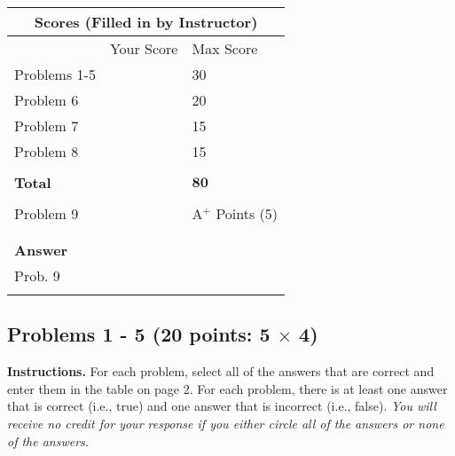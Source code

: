 \documentclass[letterpaper]{article}
\begin{document}
\vspace*{1 in}

\begin{center}
\LARGE
\begin{tabular}{|p{1.5in}|p{2.5in}|p{1.5in}|}
\hline
\multicolumn{3}{|c|}{\textbf{Scores (Filled in by Instructor)}}\\
\hline
 & Your Score& Max Score \\
\hline
Problems 1-5 &  &   30\\
\hline
Problem 6 &  &   20\\
\hline
Problem 7 &  &   15\\
\hline
Problem 8 &  &   15\\
\hline
& & \\
\hline
\textbf{Total} &  &   $\mathbf{80}$\\
\hline
& & \\
\hline
Problem 9 &  &   A$^+$ Points (5)\\
\hline
& & \\
& & \\
\hline
\textbf{Answer}  &   &   \\
 Prob. 9 & \makebox[10cm][l]{$Z^*=\begin{array}{ccc}\qquad & \qquad& \qquad \\ \qquad & \qquad & \qquad \\ \qquad & \qquad& \qquad \end{array}$} &   \\
 & & \\
\hline
\end{tabular}
\end{center}


\newpage

%
%
%

\newpage



\subsection*{Problems 1 - 5 {\rm (20 points: 5 $\times$ 4)}}

{\bf Instructions.} For each problem, select all of the answers that are correct and enter them in the table on page 2. For each problem, there is at least one answer that is correct (i.e., true) and one answer that is incorrect (i.e., false). \textit{You will receive no credit for your response if you either circle all of the answers or none of the answers.}
\end{document}
